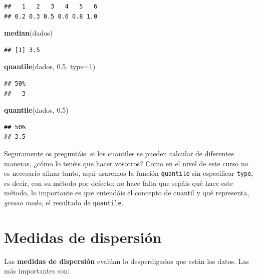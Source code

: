 \documentclass[]{book}
\newenvironment{Shaded}{\begin{snugshade}}{\end{snugshade}}
\newcommand{\DataTypeTok}[1]{\textcolor[rgb]{0.13,0.29,0.53}{#1}}
\newcommand{\DecValTok}[1]{\textcolor[rgb]{0.00,0.00,0.81}{#1}}
\newcommand{\FloatTok}[1]{\textcolor[rgb]{0.00,0.00,0.81}{#1}}
\newcommand{\KeywordTok}[1]{\textcolor[rgb]{0.13,0.29,0.53}{\textbf{#1}}}
\newcommand{\NormalTok}[1]{#1}
\theoremstyle{definition}
\theoremstyle{definition}
\theoremstyle{definition}
\theoremstyle{remark}
\begin{document}
\begin{verbatim}
##   1   2   3   4   5   6 
## 0.2 0.3 0.5 0.6 0.8 1.0
\end{verbatim}

\begin{Shaded}
\begin{Highlighting}[]
\KeywordTok{median}\NormalTok{(dados)}
\end{Highlighting}
\end{Shaded}

\begin{verbatim}
## [1] 3.5
\end{verbatim}

\begin{Shaded}
\begin{Highlighting}[]
\KeywordTok{quantile}\NormalTok{(dados, }\FloatTok{0.5}\NormalTok{, }\DataTypeTok{type=}\DecValTok{1}\NormalTok{)}
\end{Highlighting}
\end{Shaded}

\begin{verbatim}
## 50% 
##   3
\end{verbatim}

\begin{Shaded}
\begin{Highlighting}[]
\KeywordTok{quantile}\NormalTok{(dados, }\FloatTok{0.5}\NormalTok{)}
\end{Highlighting}
\end{Shaded}

\begin{verbatim}
## 50% 
## 3.5
\end{verbatim}

Seguramente os preguntáis: si los cuantiles se pueden calcular de diferentes maneras, ¿cómo lo tenéis que hacer vosotros? Como en el nivel de este curso no es necesario afinar tanto, aquí usaremos la función \texttt{quantile} sin especificar \texttt{type}, es decir, con su método por defecto; no hace falta que sepáis qué hace este método, lo importante es que entendáis el concepto de cuantil y qué representa, \emph{grosso modo}, el resultado de \texttt{quantile}.

\hypertarget{medidas-de-dispersion}{%
\section{Medidas de dispersión}\label{medidas-de-dispersion}}

Las \textbf{medidas de dispersión} evalúan lo desperdigados que están los datos. Las más importantes son:
\end{document}
